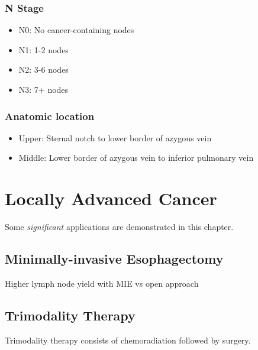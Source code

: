 \documentclass[
]{book}
\providecommand{\tightlist}{%
  \setlength{\itemsep}{0pt}\setlength{\parskip}{0pt}}
\begin{document}
\hypertarget{n-stage}{%
\subsection{N Stage}\label{n-stage}}

\begin{itemize}
\tightlist
\item
  N0: No cancer-containing nodes
\item
  N1: 1-2 nodes
\item
  N2: 3-6 nodes
\item
  N3: 7+ nodes
\end{itemize}

\hypertarget{anatomic-location}{%
\subsection{Anatomic location}\label{anatomic-location}}

\begin{itemize}
\tightlist
\item
  Upper: Sternal notch to lower border of azygous vein
\item
  Middle: Lower border of azygous vein to inferior pulmonary vein
\end{itemize}

\hypertarget{locally-advanced-cancer}{%
\chapter{Locally Advanced Cancer}\label{locally-advanced-cancer}}

Some \emph{significant} applications are demonstrated in this chapter.

\hypertarget{minimally-invasive-esophagectomy-1}{%
\section{Minimally-invasive Esophagectomy}\label{minimally-invasive-esophagectomy-1}}

Higher lymph node yield with MIE vs open approach \citep{kalffLongTermSurvivalMinimally2020}

\hypertarget{trimodality-therapy}{%
\section{Trimodality Therapy}\label{trimodality-therapy}}

Trimodality therapy consists of chemoradiation followed by surgery.
\end{document}
